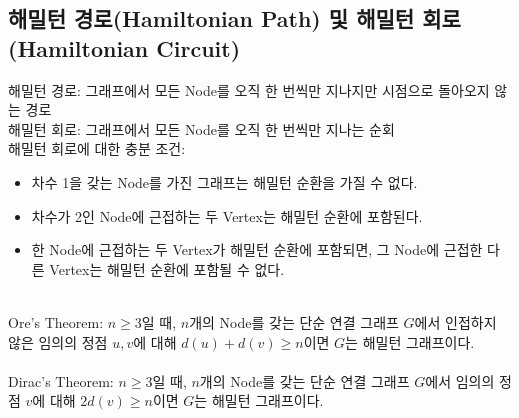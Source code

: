 \subsection{해밀턴 경로(Hamiltonian Path) 및 해밀턴 회로(Hamiltonian Circuit)}
해밀턴 경로: 그래프에서 모든 Node를 오직 한 번씩만 지나지만 시점으로 돌아오지 않는 경로\\
해밀턴 회로: 그래프에서 모든 Node를 오직 한 번씩만 지나는 순회\\
해밀턴 회로에 대한 충분 조건:
\begin{itemize}
    \item 차수 1을 갖는 Node를 가진 그래프는 해밀턴 순환을 가질 수 없다.
    \item 차수가 2인 Node에 근접하는 두 Vertex는 해밀턴 순환에 포함된다.
    \item 한 Node에 근접하는 두 Vertex가 해밀턴 순환에 포함되면, 그 Node에 근접한 다른 Vertex는 해밀턴 순환에 포함될 수 없다.
\end{itemize}\phantom{}\\
Ore's Theorem: $n \geq 3$일 때, $n$개의 Node를 갖는 단순 연결 그래프 $G$에서 인접하지 않은 임의의 정점 $u, v$에 대해 $d(u) + d(v) \geq n$이면 $G$는 해밀턴 그래프이다.\\\\
Dirac's Theorem: $n \geq 3$일 때, $n$개의 Node를 갖는 단순 연결 그래프 $G$에서 임의의 정점 $v$에 대해 $2d(v) \geq n$이면 $G$는 해밀턴 그래프이다.


